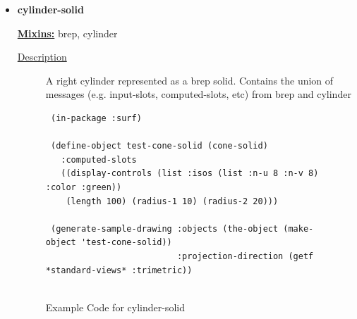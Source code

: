 \documentclass [11pt]{book}
\begin{document}
\begin{itemize}
\begin{description}
\end{description}







\item {}
\label{prim:cylinder-solid}
\textbf{cylinder-solid}


\textbf{
\underline{Mixins:}} brep, cylinder





\begin{description}

\item [
\underline{Description}]


A right cylinder represented as a brep solid. Contains the union of messages (e.g. input-slots, computed-slots, etc)
from brep and cylinder



\end{description}




\begin{figure}
\begin{lrbox}{\boxedverb}
\begin{minipage}{\linewidth}
{\small

\begin{verbatim}
 (in-package :surf)

 (define-object test-cone-solid (cone-solid)
   :computed-slots
   ((display-controls (list :isos (list :n-u 8 :n-v 8) :color :green))
    (length 100) (radius-1 10) (radius-2 20)))
 
 (generate-sample-drawing :objects (the-object (make-object 'test-cone-solid))
                          :projection-direction (getf *standard-views* :trimetric))


\end{verbatim}}
\end{minipage}
\end{lrbox}
\fbox{\usebox{\boxedverb}}

\caption{Example Code for cylinder-solid}

\label{fig:example-code-cylinder-solid}

\end{figure}


\end{itemize}
\end{document}

